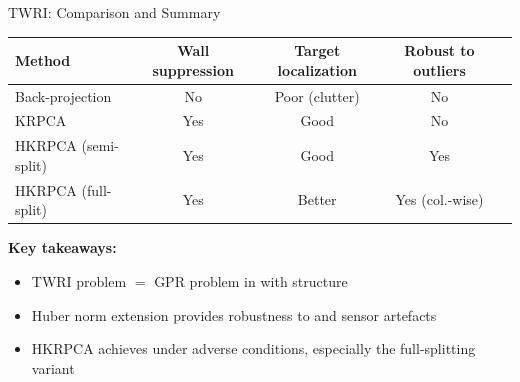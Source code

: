 \begin{frame}{TWRI: Comparison and Summary}

  \begin{center}
    \small
    \begin{tabular}{@{}lcccc@{}}
      \toprule
      \textbf{Method}
        & \textbf{Wall suppression}
        & \textbf{Target localization}
        & \textbf{Robust to outliers} \\
      \midrule
      Back-projection
        & No
        & Poor (clutter)
        & No \\
      KRPCA
        & Yes
        & Good
        & No \\
      HKRPCA (semi-split)
        & Yes
        & Good
        & Yes \\
      HKRPCA (full-split)
        & Yes
        & Better
        & Yes (col.-wise) \\
      \bottomrule
    \end{tabular}
  \end{center}

  \vspace{0.5em}
  \textbf{Key takeaways:}

  \vspace{0.3em}
  \begin{itemize}
    \item TWRI problem $=$ GPR problem in 
          with  structure
    \item Huber norm extension provides robustness to
           and sensor artefacts
    \item HKRPCA achieves 
          under adverse conditions, especially the full-splitting variant
  \end{itemize}

\end{frame}
